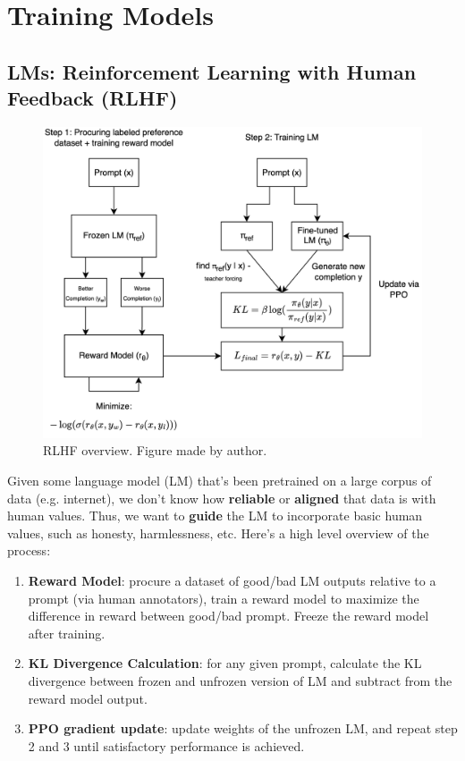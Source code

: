 \documentclass[12pt]{article}
\begin{document}
\section{Training Models}

\subsection{LMs: Reinforcement Learning with Human Feedback (RLHF)}

\begin{figure}[H]
    \centering
    \includegraphics[width=1\textwidth]{../media/rlhf_light.png}
    \caption{RLHF overview. Figure made by author.}
    \label{fig:rlhf}
\end{figure}

Given some language model (LM) that's been pretrained on a large corpus of data (e.g. internet), we don't know how \textbf{reliable} or \textbf{aligned} that data is with human values. Thus, we want to \textbf{guide} the LM to incorporate basic human values, such as honesty, harmlessness, etc. Here's a high level overview of the process:

\begin{enumerate}
    \item \textbf{Reward Model}: procure a dataset of good/bad LM outputs relative to a prompt (via human annotators), train a reward model to maximize the difference in reward between good/bad prompt. Freeze the reward model after training. 
    \item \textbf{KL Divergence Calculation}: for any given prompt, calculate the KL divergence between frozen and unfrozen version of LM and subtract from the reward model output. 
    \item \textbf{PPO gradient update}: update weights of the unfrozen LM, and repeat step 2 and 3 until satisfactory performance is achieved. 
\end{enumerate}
\end{document}

